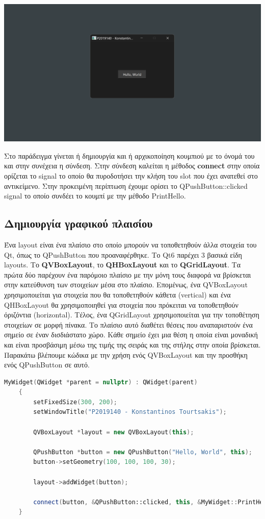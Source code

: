 \includegraphics[width=1.0\textwidth]{./images/QPushButton.png}

Στο παράδειγμα γίνεται ή δημιουργία και ή αρχικοποίηση κουμπιού με το όνομά του και στην συνέχεια η σύνδεση.
Στην σύνδεση καλείται η μέθοδος \textbf{connect} στην οποία ορίζεται το signal το οποίο
θα πυροδοτήσει την κλήση του slot που έχει ανατεθεί στο αντικείμενο. Στην προκειμένη περίπτωση έχουμε
ορίσει το QPushButton::clicked signal το οποίο συνδέει το κουμπί με την μέθοδο PrintHello.

\subsection{Δημιουργία γραφικού πλαισίου}
Ένα layout είναι ένα πλαίσιο στο οποίο μπορούν να τοποθετηθούν άλλα στοιχεία του Qt, όπως
το QPushButton που προαναφέρθηκε. Το Qt6 παρέχει 3 βασικά είδη layouts. Το \textbf{QVBoxLayout}, το
\textbf{QHBoxLayout} και το \textbf{QGridLayout}. Τα πρώτα δύο παρέχουν ένα παρόμοιο πλαίσιο με την μόνη
τους διαφορά να βρίσκεται στην κατεύθυνση των στοιχείων μέσα στο πλαίσιο. Επομένως, ένα
QVBoxLayout χρησιμοποιείται για στοιχεία που θα τοποθετηθούν κάθετα (vertical) και ένα
QHBoxLayout θα χρησιμοποιηθεί για στοιχεία που πρόκειται να τοποθετηθούν όριζόντια (horizontal).
Τέλος, ένα QGridLayout χρησιμοποιείται για την τοποθέτηση στοιχείων σε μορφή πίνακα. Το
πλαίσιο αυτό διαθέτει θέσεις που αναπαριστούν ένα σημείο σε έναν δισδιάστατο χώρο. Κάθε σημείο
έχει μια θέση η οποία είναι μοναδική και είναι προσβάσιμη μέσω της τιμής της σειράς και της
στήλης στην οποία βρίσκεται. Παρακάτω βλέπουμε κώδικα με την χρήση ενός QVBoxLayout και την
προσθήκη ενός QPushButton σε αυτό.
\begin{lstlisting}[language=C++, style=cppstyle]
	MyWidget(QWidget *parent = nullptr) : QWidget(parent) 
    {
        setFixedSize(300, 200);
        setWindowTitle("P2019140 - Konstantinos Tourtsakis");
        
        QVBoxLayout *layout = new QVBoxLayout(this);

        QPushButton *button = new QPushButton("Hello, World", this);
        button->setGeometry(100, 100, 100, 30);

        layout->addWidget(button);

        connect(button, &QPushButton::clicked, this, &MyWidget::PrintHello);
    }

\end{lstlisting}

